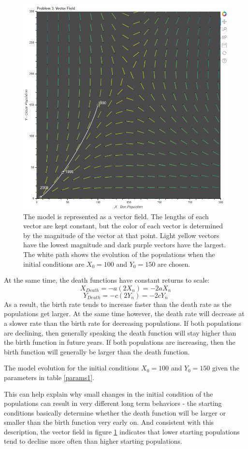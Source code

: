 \documentclass[12pt,a4paper,titlepage]{report}
\begin{document}
		\begin{figure}[htbp]
			\centerline{\includegraphics[scale=.5]{charts/problem3_chart.png}}
			\caption{The model is represented as a vector field. The lengths of each vector are kept constant, but the color of each vector is determined by the magnitude of the vector at that point. Light yellow vectors have the lowest magnitude and dark purple vectors have the largest. The white path shows the evolution of the populations when the initial conditions are \(X_{0} = 100\) and \(Y_{0} = 150\) are chosen.}
			\label{fig:p3}
		\end{figure}
		At the same time, the death functions have constant returns to scale:
		\[X_{Death} = -a (2X_{n}) = -2aX_{n}\]
		\[Y_{Death} = -c (2Y_{n}) = -2cY_{n}\]
		As a result, the birth rate tends to increase faster than the death rate as the populations get larger. At the same time however, the death rate will decrease at a slower rate than the birth rate for decreasing populations. If both populations are declining, then generally speaking the death function will stay higher than the birth function in future years. If both populations are increasing, then the birth function will generally be larger than the death function. 
		\begin{table} 
			\centering
			
			\caption{The model evolution for the initial conditions \(X_{0} = 100\) and \(Y_{0} = 150\) given the parameters in table \ref{params1}.}
			\label{tab:p3}
		\end{table}
		This can help explain why small changes in the initial condition of the populations can result in very different long term behaviors - the starting conditions basically determine whether the death function will be larger or smaller than the birth function very early on. And consistent with this description, the vector field in figure \ref{fig:p3} indicates that lower starting populations tend to decline more often than higher starting populations. 
		
\end{document}
